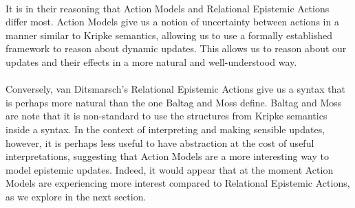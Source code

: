 \documentclass[12pt, a4paper, twoside]{article}
\begin{document}
\\
It is in their reasoning that Action Models and Relational Epistemic Actions
differ most.
Action Models give us a notion of uncertainty between actions in a manner
similar to Kripke semantics, allowing us to use a formally established framework
to reason about dynamic updates.
This allows us to reason about our updates and their effects in a more natural
and well-understood way.\\
\\
Conversely, van Ditsmarsch's Relational Epistemic Actions give us a syntax that
is perhaps more natural than the one Baltag and Moss define.
Baltag and Moss are note that it is non-standard to use the structures from
Kripke semantics inside a syntax.
In the context of interpreting and making sensible updates, however, it is
perhaps less useful to have abstraction at the cost of useful interpretations,
suggesting that Action Models are a more interesting way to model epistemic
updates.
Indeed, it would appear that at the moment Action Models are experiencing more
interest compared to Relational Epistemic Actions, as we explore in the next
section.
\end{document}
